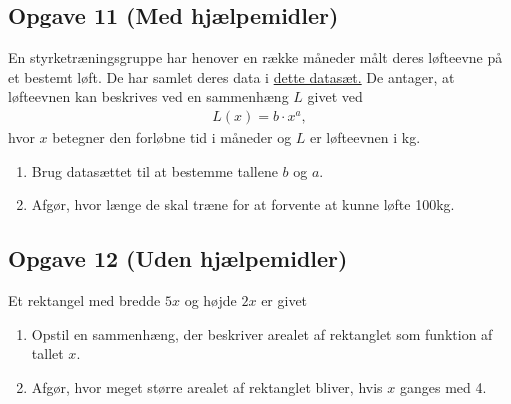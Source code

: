\subsection*{Opgave 11 (Med hjælpemidler)}

En styrketræningsgruppe har henover en række måneder målt deres løfteevne på et bestemt løft. De har samlet deres data i \href{https://github.com/ChristianJLex/TeachingNotes/raw/master/2024-2025/Data og lign/Traening.xlsx}{\color{blue!60} dette datasæt.} De antager, at løfteevnen kan beskrives ved en sammenhæng $L$ givet ved 
\begin{align*}
	L(x) = b\cdot x^a,
\end{align*}
hvor $x$ betegner den forløbne tid i måneder og $L$ er løfteevnen i kg. 

\begin{enumerate}[label=\roman*)]
	\item Brug datasættet til at bestemme tallene $b$ og $a$. 
	\item Afgør, hvor længe de skal træne for at forvente at kunne løfte 100kg.
\end{enumerate}

\subsection*{Opgave 12 (Uden hjælpemidler)}

Et rektangel med bredde $5x$ og højde $2x$ er givet
\begin{enumerate}[label=\roman*)]
	\item Opstil en sammenhæng, der beskriver arealet af rektanglet som funktion af tallet $x$. 
	\item Afgør, hvor meget større arealet af rektanglet bliver, hvis $x$ ganges med 4. 
\end{enumerate}